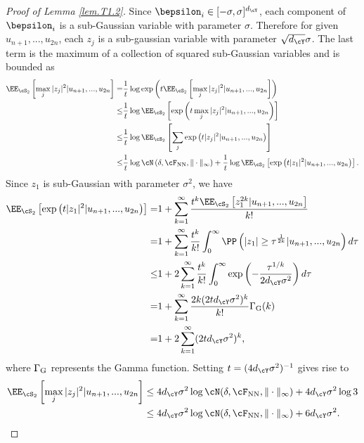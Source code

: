 \documentclass[11pt]{article} %
\begin{document}
\begin{proof}[Proof of Lemma \ref{lem.T1.2}]
	Since $\bepsilon_i\in [-\sigma,\sigma]^{d_{\cY}}$, each component of $\bepsilon_i$ is a sub-Gaussian variable with parameter $\sigma$. Therefore for given $u_{n+1},...,u_{2n}$, each $z_j$ is a sub-gaussian variable with parameter $\sqrt{d_{\cY}}\sigma$. The last term is the maximum of a collection of squared sub-Gaussian variables and is bounded as 
	\begin{align}
		\EE_{\cS_2}\left[\max_j |z_j|^2|u_{n+1},...,u_{2n}\right]=&\frac{1}{t}\log \exp\left(t\EE_{\cS_2}\left[\max_j |z_j|^2| u_{n+1},...,u_{2n}\right] \right)  \nonumber\\
		\leq & \frac{1}{t}\log \EE_{\cS_2}\left[\exp\left(t\max_j |z_j|^2| u_{n+1},...,u_{2n} \right)\right] \nonumber \\
		\leq& \frac{1}{t}\log \EE_{\cS_2}\left[\sum_j\exp\left(t |z_j|^2| u_{n+1},...,u_{2n} \right)\right] \nonumber \\
		\leq & \frac{1}{t}\log \cN\left(\delta,\cF_{\rm NN}, \|\cdot\|_{\infty}\right)+\frac{1}{t}\log\EE_{\cS_2}\left[\exp\left(t |z_1|^2| u_{n+1},...,u_{2n} \right) \right].
	\end{align}
	Since $z_1$ is sub-Gaussian with parameter $\sigma^2$, we have
	\begin{align}
		\EE_{\cS_2}\left[\exp\left(t |z_1|^2| u_{n+1},...,u_{2n}\right)\right]=&1+\sum_{k=1}^{\infty} \frac{t^k\EE_{\cS_2} \left[z_1^{2k}|u_{n+1},...,u_{2n} \right]}{k!} \nonumber\\
		=& 1+\sum_{k=1}^{\infty} \frac{t^k}{k!}\int_0^{\infty} \PP\left(|z_1|\geq \tau^{\frac{1}{2k}}|u_{n+1},...,u_{2n}\right)d\tau \nonumber\\
		\leq& 1+2\sum_{k=1}^{\infty} \frac{t^k}{k!}\int_0^{\infty} \exp\left(-\frac{\tau^{1/k}}{2d_{\cY}\sigma^2}\right)d\tau \nonumber\\
		=& 1+\sum_{k=1}^{\infty} \frac{2k(2td_{\cY}\sigma^2)^k}{k!}\Gamma_{\rm G}(k) \nonumber\\
		=& 1+2\sum_{k=1}^{\infty} (2td_{\cY}\sigma^2)^k,
	\end{align}
	where $\Gamma_{\rm G}$ represents the Gamma function. Setting $t=(4d_{\cY}\sigma^2)^{-1}$ gives rise to
	\begin{align}
		\EE_{\cS_2}\left[\max_j |z_j|^2|u_{n+1},...,u_{2n}\right] & \leq 4d_{\cY}\sigma^2 \log \cN(\delta,\cF_{\rm NN}, \|\cdot\|_{\infty}) +4d_{\cY}\sigma^2\log 3 \nonumber\\
		&\leq  4d_{\cY}\sigma^2 \log \cN(\delta,\cF_{\rm NN}, \|\cdot\|_{\infty}) +6d_{\cY}\sigma^2.
		\label{eq.T1.4}
	\end{align}
	

\end{proof}
\end{document}
